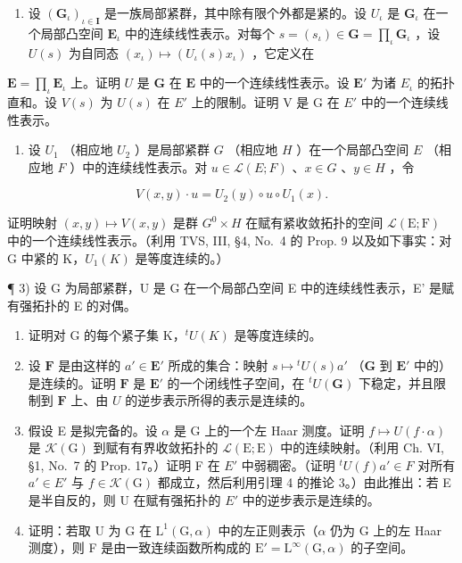 \exercisesection{}

\begin{enumerate}
\def\labelenumi{\arabic{enumi})}
\tightlist
\item
  设 \((\mathbf{G}_{\iota})_{\iota \in \mathbf{I}}\) 是一族局部紧群，其中除有限个外都是紧的。设 \(U_{\iota}\) 是 \(\mathbf{G}_{\iota}\) 在一个局部凸空间 \(\mathbf{E}_{\iota}\) 中的连续线性表示。对每个 \(s = (s_{\iota}) \in \mathbf{G} = \prod_{\iota} \mathbf{G}_{\iota}\) ，设 \(U(s)\) 为自同态 \((x_{\iota}) \mapsto (U_{\iota}(s)x_{\iota})\) ，它定义在
\end{enumerate}

\(\mathbf{E} = \prod_{\iota}\mathbf{E}_{\iota}\) 上。证明 \(U\) 是 \(\mathbf{G}\) 在 \(\mathbf{E}\) 中的一个连续线性表示。设 \(\mathbf{E}'\) 为诸 \(E_{\iota}\) 的拓扑直和。设 \(V(s)\) 为 \(U(s)\) 在 \(E'\) 上的限制。证明 V 是 G 在 \(E'\) 中的一个连续线性表示。

\begin{enumerate}
\def\labelenumi{\arabic{enumi})}
\setcounter{enumi}{1}
\tightlist
\item
  设 \(U_{1}\) （相应地 \(U_{2}\) ）是局部紧群 \(G\) （相应地 \(H\) ）在一个局部凸空间 \(E\) （相应地 \(F\) ）中的连续线性表示。对 \(u \in \mathcal{L}(E; F)\) 、\(x \in G\) 、\(y \in H\) ，令
\end{enumerate}

\[
V (x, y) \cdot u = U _ {2} (y) \circ u \circ U _ {1} (x).
\]

证明映射 \((x,y)\mapsto V(x,y)\) 是群 \(G^{0}\times H\) 在赋有紧收敛拓扑的空间 \(\mathcal{L}(\mathrm{E};\mathrm{F})\) 中的一个连续线性表示。（利用 TVS, III, §4, No.~4 的 Prop. 9 以及如下事实：对 G 中紧的 K，\(U_{1}(K)\) 是等度连续的。）

¶ 3) 设 G 为局部紧群，U 是 G 在一个局部凸空间 E 中的连续线性表示，E' 是赋有强拓扑的 E 的对偶。

\begin{enumerate}
\def\labelenumi{\alph{enumi})}
\item
  证明对 G 的每个紧子集 K，\({}^{t}U(K)\) 是等度连续的。
\item
  设 \(\mathbf{F}\) 是由这样的 \(a' \in \mathbf{E}'\) 所成的集合：映射 \(s \mapsto {}^t U(s)a'\) （\(\mathbf{G}\) 到 \(\mathbf{E}'\) 中的）是连续的。证明 \(\mathbf{F}\) 是 \(\mathbf{E}'\) 的一个闭线性子空间，在 \({}^t U(\mathbf{G})\) 下稳定，并且限制到 \(\mathbf{F}\) 上、由 \(U\) 的逆步表示所得的表示是连续的。
\item
  假设 E 是拟完备的。设 \(\alpha\) 是 G 上的一个左 Haar 测度。证明 \(f \mapsto U(f \cdot \alpha)\) 是 \(\mathcal{K}(\mathrm{G})\) 到赋有有界收敛拓扑的 \(\mathcal{L}(\mathrm{E};\mathrm{E})\) 中的连续映射。（利用 Ch. VI, §1, No.~7 的 Prop. 17。）证明 F 在 \(E'\) 中弱稠密。（证明 \({}^{t}U(f)a' \in F\) 对所有 \(a' \in E'\) 与 \(f \in \mathcal{K}(\mathrm{G})\) 都成立，然后利用引理 4 的推论 3。）由此推出：若 E 是半自反的，则 U 在赋有强拓扑的 \(E'\) 中的逆步表示是连续的。
\item
  证明：若取 U 为 G 在 \(\mathrm{L}^{1}(\mathrm{G},\alpha)\) 中的左正则表示（\(\alpha\) 仍为 G 上的左 Haar 测度），则 F 是由一致连续函数所构成的 \(\mathrm{E}' = \mathrm{L}^{\infty}(\mathrm{G},\alpha)\) 的子空间。
\end{enumerate}

